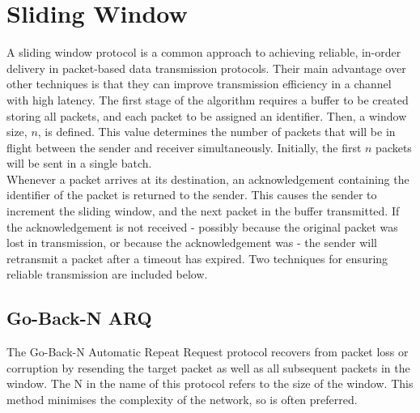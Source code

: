 \section{Sliding Window}
\label{app:slidingWindow}
\indent \indent
A sliding window protocol is a common approach to achieving reliable, in-order delivery in packet-based data transmission protocols. Their main advantage over other techniques is that they can improve transmission efficiency in a channel with high latency. The first stage of the algorithm requires a buffer to be created storing all packets, and each packet to be assigned an identifier. Then, a window size, $n$, is defined. This value determines the number of packets that will be in flight between the sender and receiver simultaneously. Initially, the first $n$ packets will be sent in a single batch.
\smallskip \\ \indent
Whenever a packet arrives at its destination, an acknowledgement containing the identifier of the packet is returned to the sender. This causes the sender to increment the sliding window, and the next packet in the buffer transmitted. If the acknowledgement is not received - possibly because the original packet was lost in transmission, or because the acknowledgement was - the sender will retransmit a packet after a timeout has expired. Two techniques for ensuring reliable transmission are included below.
\subsection{Go-Back-N ARQ}
\indent \indent
The Go-Back-N Automatic Repeat Request protocol recovers from packet loss or corruption by resending the target packet as well as all subsequent packets in the window. The N in the name of this protocol refers to the size of the window. This method minimises the complexity of the network, so is often preferred.
